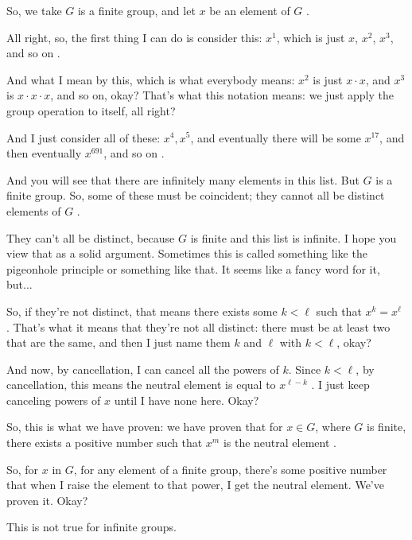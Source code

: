 \begin{speech}[01:19:33 - 01:20:53]
So, we take $G$ is a finite group, and let $x$ be an element of $G$ .

All right, so, the first thing I can do is consider this: $x^1$, which is just $x$, $x^2$, $x^3$, and so on .

And what I mean by this, which is what everybody means: $x^2$ is just $x \cdot x$, and $x^3$ is $x \cdot x \cdot x$, and so on, okay?  That's what this notation means: we just apply the group operation to itself, all right?

And I just consider all of these: $x^4, x^5$, and eventually there will be some $x^{17}$, and then eventually $x^{691}$, and so on .

And you will see that there are infinitely many elements in this list. But $G$ is a finite group. So, some of these must be coincident; they cannot all be distinct elements of $G$ .
\end{speech}

\begin{speech}[01:20:53 - 01:21:43]
They can't all be distinct, because $G$ is finite and this list is infinite. I hope you view that as a solid argument. Sometimes this is called something like the pigeonhole principle or something like that. It seems like a fancy word for it, but...

So, if they're not distinct, that means there exists some $k < \ell$ such that $x^k = x^\ell$ . That's what it means that they're not all distinct: there must be at least two that are the same, and then I just name them $k$ and $\ell$ with $k < \ell$, okay?

And now, by cancellation, I can cancel all the powers of $k$. Since $k < \ell$, by cancellation, this means the neutral element is equal to $x^{\ell - k}$ . I just keep canceling powers of $x$ until I have none here. Okay?
\end{speech}

\begin{speech}[01:21:43 - 01:22:38]
So, this is what we have proven: we have proven that for $x \in G$, where $G$ is finite, there exists a positive number such that $x^m$ is the neutral element .

So, for $x$ in $G$, for any element of a finite group, there's some positive number that when I raise the element to that power, I get the neutral element. We've proven it. Okay?

This is not true for infinite groups.
\end{speech}

